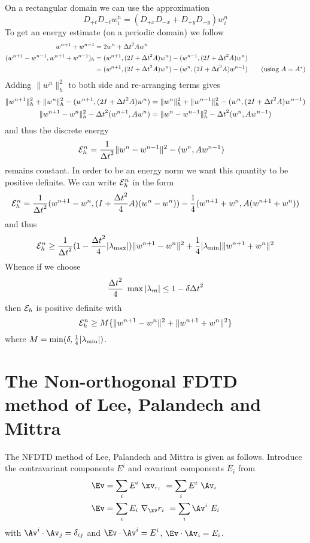 \documentclass[10pt]{article}
\newcommand{\grad}{\nabla}
\begin{document}
On a rectangular domain we can use the approximation
\[
   D_{+t}D_{-t} w_i^n = (D_{+x}D_{-x}+D_{+y}D_{-y}) w_i^n
\]
To get an energy estimate (on a periodic domain) we follow\cite{KreissPeterssonYstrom2002}
\begin{align*}
  w^{n+1} + w^{n-1} &= 2 w^n + {\Delta t}^2 A w^n \\
 (w^{n+1} - w^{n-1}, w^{n+1} + w^{n-1} )_h &= (w^{n+1},(2I+{\Delta t}^2 A)w^n) - (w^{n-1},(2I+{\Delta t}^2 A)w^n) \\
                 &= (w^{n+1},(2I+{\Delta t}^2 A)w^n) - (w^{n},(2I+{\Delta t}^2 A)w^{n-1})  \qquad\mbox{(using $A=A^*$)} 
\end{align*}
Adding $\| w^{n} \|_h^2$ to both side and re-arranging terms gives
\begin{align*}
  \| w^{n+1} \|_h^2 + \| w^{n} \|_h^2 - (w^{n+1},(2I+{\Delta t}^2 A)w^n)
            &= \| w^{n} \|_h^2 + \| w^{n-1} \|_h^2 - (w^{n},(2I+{\Delta t}^2 A)w^{n-1}) \\
  \| w^{n+1}- w^{n} \|_h^2 - {\Delta t}^2 (w^{n+1},A w^n) &= \| w^{n}- w^{n-1} \|_h^2 - {\Delta t}^2 (w^{n},A w^{n-1})
\end{align*}
and thus the discrete energy
\begin{align*}
  {\cal E}_h^n  &= {1\over {\Delta t}^2} \| w^{n}-w^{n-1}\|^2 - (w^{n},A w^{n-1})
\end{align*}
remains constant. 
In order to be an energy norm we want this quantity to be positive definite.
We can write ${\cal E}_h^n$ in the form
\[
 {\cal E}_h^n  = {1\over {\Delta t}^2} (w^{n+1}- w^{n},(I+{{\Delta t}^2\over4} A)(w^n- w^{n})) 
                 - {1\over4}(w^{n+1}+ w^{n}, A(w^{n+1}+ w^{n})) 
\]
and thus 
\[
 {\cal E}_h^n  \ge {1\over {\Delta t}^2} (1-{{\Delta t}^2\over4}|\lambda_{\rm max}|)\|w^{n+1}- w^{n}\|^2
                 +{1\over4} |\lambda_{\rm min}| \| w^{n+1}+ w^{n} \|^2 
\]  
Whence if we choose 
\[
  {{\Delta t}^2 \over4} ~\max |\lambda_m| \le 1 - \delta{{\Delta t}^2}
\]
then ${\cal E}_h$ is positive definite with 
\[
    {\cal E}_h^n  \ge M \{ \|w^{n+1}- w^{n}\|^2 + \| w^{n+1}+ w^{n} \|^2 \} 
\]
where $M=\min( \delta, {1\over4} |\lambda_{\rm min}| )$.


\clearpage
\section{The Non-orthogonal FDTD method of Lee, Palandech and Mittra}

The NFDTD method of Lee, Palandech and Mittra\cite{Lee92} is given as follows.
Introduce the contravariant components $E^i$ and covariant components $E_i$ from 
\begin{align*}
     \Ev &= \sum_i E^i ~\xv_{r_i} ~= \sum_i E^i ~\Av_i \\
     \Ev &= \sum_i E_i ~\grad_\xv r_i ~= \sum_i \Av^i ~E_i 
\end{align*}
with $\Av^i\cdot\Av_j = \delta_{ij}$ and $\Ev\cdot\Av^i = E^i$, $\Ev\cdot\Av_i = E_i$.
\end{document}
